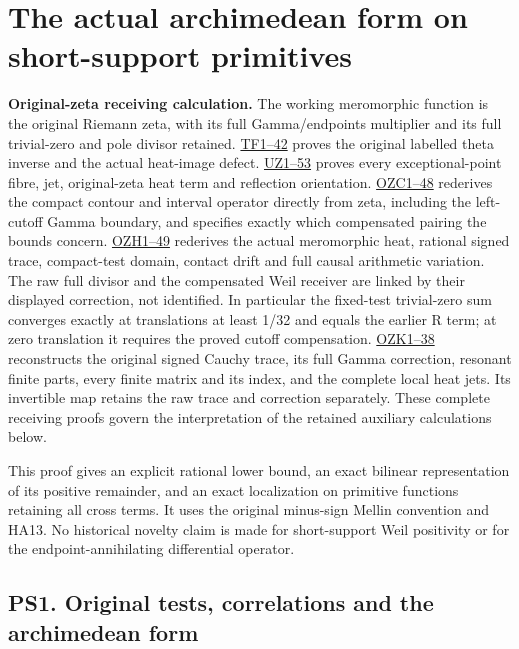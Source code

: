 \documentclass[
  10pt,
  a4paper,
]{article}
\author{}
\date{}
\begin{document}
{
\setcounter{tocdepth}{3}
\tableofcontents
}
\section{The actual archimedean form on short-support
primitives}\label{the-actual-archimedean-form-on-short-support-primitives}

\textbf{Original-zeta receiving calculation.} The working meromorphic
function is the original Riemann zeta, with its full Gamma/endpoints
multiplier and its full trivial-zero and pole divisor retained.
\href{FAITHFUL_THETA_COMPLETION_RETURN.md}{TF1--42} proves the original
labelled theta inverse and the actual heat-image defect.
\href{FAITHFUL_UNCOMPLETED_ZETA_HEAT.md}{UZ1--53} proves every
exceptional-point fibre, jet, original-zeta heat term and reflection
orientation.
\href{ORIGINAL_ZETA_COMPACT_WEIL_RECONSTRUCTION.md}{OZC1--48} rederives
the compact contour and interval operator directly from zeta, including
the left-cutoff Gamma boundary, and specifies exactly which compensated
pairing the bounds concern.
\href{ORIGINAL_ZETA_HEAT_CONTACT_RECONSTRUCTION.md}{OZH1--49} rederives
the actual meromorphic heat, rational signed trace, compact-test domain,
contact drift and full causal arithmetic variation. The raw full divisor
and the compensated Weil receiver are linked by their displayed
correction, not identified. In particular the fixed-test trivial-zero
sum converges exactly at translations at least 1/32 and equals the
earlier R term; at zero translation it requires the proved cutoff
compensation. \href{ORIGINAL_ZETA_CAUCHY_RECONSTRUCTION.md}{OZK1--38}
reconstructs the original signed Cauchy trace, its full Gamma
correction, resonant finite parts, every finite matrix and its index,
and the complete local heat jets. Its invertible map retains the raw
trace and correction separately. These complete receiving proofs govern
the interpretation of the retained auxiliary calculations below.

This proof gives an explicit rational lower bound, an exact bilinear
representation of its positive remainder, and an exact localization on
primitive functions retaining all cross terms. It uses the original
minus-sign Mellin convention and HA13. No historical novelty claim is
made for short-support Weil positivity or for the endpoint-annihilating
differential operator.

\subsection{PS1. Original tests, correlations and the archimedean
form}\label{ps1.-original-tests-correlations-and-the-archimedean-form}
\end{document}
